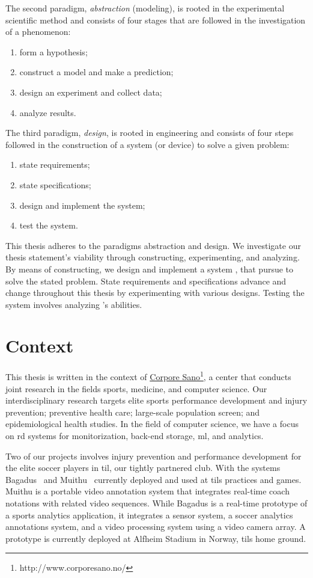 The second paradigm, \emph{abstraction} (modeling), is rooted in the experimental scientific method and consists of four stages that are followed in the investigation of a phenomenon: 
\begin{enumerate}
    \item form a hypothesis;
    \item construct a model and make a prediction;
    \item design an experiment and collect data;
    \item analyze results.
\end{enumerate}

The third paradigm, \emph{design}, is rooted in engineering and consists of four steps followed in the construction of a system (or device) to solve a given problem:
\begin{enumerate}
    \item state requirements; 
    \item state specifications;
    \item design and implement the system;
    \item test the system.
\end{enumerate}

This thesis adheres to the paradigms abstraction and design. We investigate our thesis statement's viability through constructing, experimenting, and analyzing. By means of constructing, we design and implement a system \project, that pursue to solve the stated problem. State requirements and specifications advance and change throughout this thesis by experimenting with various designs. Testing the system involves analyzing \project's abilities.

\section{Context}\label{sec:context}
This thesis is written in the context of \href{http://www.corporesano.no/}{Corpore Sano}\footnote{http://www.corporesano.no/}, a center that conducts joint research in the fields sports, medicine, and computer science. Our interdisciplinary research targets elite sports performance development and injury prevention; preventive health care; large-scale population screen; and epidemiological health studies. In the field of computer science, we have a focus on \ac{rd} systems for monitorization, back-end storage, \ac{ml}, and analytics.

Two of our projects involves injury prevention and performance development for the elite soccer players in \ac{til}, our tightly partnered club. With the systems Bagadus~\cite{halvorsen2013bagadus} and Muithu~\cite{johansen2012muithu} currently deployed and used at \acp{til} practices and games. Muithu is a portable video annotation system that integrates real-time coach notations with related video sequences. While Bagadus is a real-time prototype of a sports analytics application, it integrates a sensor system, a soccer analytics annotations system, and a video processing system using a video camera array. A prototype is currently deployed at Alfheim Stadium in Norway, \acp{til} home ground.

